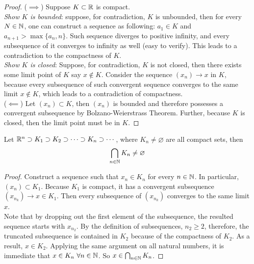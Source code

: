 \documentclass[11pt]{article}
\begin{document}
	\begin{proof}
		($\implies$) Suppose $K \subset \mathbb{R}$ is compact. \\
		\emph{Show $K$ is bounded}: suppose, for contradiction, $K$ is unbounded, then for every $N \in \mathbb{N}$, one can construct a sequence as following: $a_1 \in K$ and $a_{n+1} > \max\{a_n, n\}$. Such sequence diverges to positive infinity, and every subsequence of it converges to infinity as well (easy to verify). This leads to a contradiction to the compactness of $K$. \\
		\emph{Show $K$ is closed}: Suppose, for contradiction, $K$ is not closed, then there exists some limit point of $K$ say $x \notin K$. Consider the sequence $(x_n) \to x$ in $K$, because every subsequence of such convergent sequence converges to the same limit $x \notin K$, which leads to a contradiction of compactness. \\
		($\impliedby$) Let $(x_n) \subset K$, then $(x_n)$ is bounded and therefore possesses a convergent subsequence by Bolzano-Weierstrass Theorem. Further, because $K$ is closed, then the limit point must be in $K$.
	\end{proof}
	
	\begin{theorem}
		Let $\mathbb{R}^n \supset K_1 \supset K_2 \supset \cdots \supset K_n \supset \cdots$, where $K_n \neq \varnothing$ are all compact sets, then
		\begin{align}
			\bigcap_{n \in \mathbb{N}} K_n \neq \varnothing
		\end{align}
	\end{theorem}
	
	\begin{proof}
		Construct a sequence such that $x_n \in K_n$ for every $n \in \mathbb{N}$. In particular, $(x_n) \subset K_1$. Because $K_1$ is compact, it has  a convergent subsequence $(x_{n_k}) \to x \in K_1$. Then every subsequence of $(x_{n_k})$ converges to the same limit $x$.
		\\Note that by dropping out the first element of the subsequence, the resulted sequence starts with $x_{n_2}$. By the definition of subsequences, $n_2 \geq 2$, therefore, the truncated subsequence is contained in $K_2$ because of the compactness of $K_2$. As a result, $x \in K_2$. Applying the same argument on all natural numbers, it is immediate that $x \in K_n\ \forall n \in \mathbb{N}$. So $x \in \bigcap_{n \in \mathbb{N}} K_n$.
	\end{proof}
	
\end{document}
